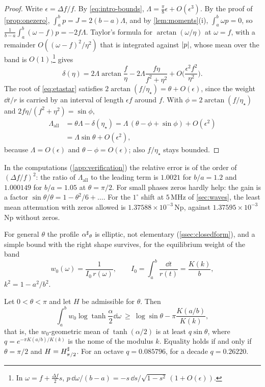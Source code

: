 \begin{proof}
Write $\epsilon=\Delta f/f$. By \eqref{eq:intro-bounds}, $\Lambda=\frac\pi8\epsilon+O(\epsilon^3)$.
By the proof of \cref{prop:onezero}, $\int_a^bp=J=2(b-a)\Lambda$, and by
\cref{lem:moments}(i), $\int_a^b\omega p=0$, so
$\frac1{b-a}\int_a^b(\omega-f)p=-2f\Lambda$. Taylor's formula for
$\arctan(\omega/\eta)$ at $\omega=f$, with a remainder $O((\omega-f)^2/\eta^2)$ that
is integrated against $\left|p\right|$, whose mean over the band is
$O(1)$,\footnote{In $\omega=f+\frac{\Delta f}2s$, $p\,\dd\omega/(b-a)=-s\,\dd s/\sqrt{1-s^2}\,(1+O(\epsilon))$.}
gives
\[
\delta(\eta)=2\Lambda\arctan\frac f\eta-2\Lambda\frac{f\eta}{f^2+\eta^2}
+O\Big(\frac{\epsilon^2f^2}{\eta^2}\Big).
\]
The root of \eqref{eq:etastar} satisfies $2\arctan(f/\eta_\star)=\theta+O(\epsilon)$,
since the weight $\dd t/r$ is carried by an interval of length $\epsilon f$
around $f$. With $\phi=2\arctan(f/\eta_\star)$ and
$2f\eta/(f^2+\eta^2)=\sin\phi$,
\begin{align*}
\Lambda_{\mathrm{all}}&=\theta\Lambda-\delta(\eta_\star)=\Lambda\,(\theta-\phi+\sin\phi)+O(\epsilon^2)\\
&=\Lambda\sin\theta+O(\epsilon^2),
\end{align*}
because $\Lambda=O(\epsilon)$ and $\theta-\phi=O(\epsilon)$; also $f/\eta_\star$ stays
bounded.
\end{proof}

In the computations (\cref{app:verification}) the relative error is of the
order of $(\Delta f/f)^2$: the ratio of $\Lambda_{\mathrm{all}}$ to the leading
term is $1.0021$ for $b/a=1.2$ and $1.000149$ for $b/a=1.05$ at $\theta=\pi/2$.
For small phases zeros hardly help: the gain is a factor
$\sin\theta/\theta=1-\theta^2/6+\dots$. For the $1^\circ$ shift at $5$\,MHz of
\cref{sec:waves}, the least mean attenuation with zeros allowed is
$1.37588\times10^{-3}$\,Np, against $1.37595\times10^{-3}$\,Np without zeros.

For general $\theta$ the profile ${\alpha^{\sharp}}_\theta$ is elliptic, not elementary
(\cref{ssec:closedform}), and a simple bound with the right shape survives, for the equilibrium weight of the band
\[
w_0(\omega)=\frac1{I_0\,r(\omega)},\qquad I_0=\int_a^b\frac{\dd t}{r(t)}=\frac{K(k)}b ,
\]
$k^2=1-a^2/b^2$.

\begin{corollary}\label{cor:nome}
Let $0<\theta<\pi$ and let $H$ be admissible for $\theta$. Then
\begin{equation}\label{eq:nome}
\int_a^bw_0\log\tanh\frac\alpha2\dd\omega\ \ge\ \log\sin\theta-\pi\frac{K(a/b)}{K(k)} ,
\end{equation}
that is, the $w_0$-geometric mean of $\tanh(\alpha/2)$ is at least
$q\sin\theta$, where $q=e^{-\pi K(a/b)/K(k)}$ is the nome of the modulus $k$.
Equality holds if and only if $\theta=\pi/2$ and $H=H^{\sharp}_{\pi/2}$. For an octave
$q=0.085796$, for a decade $q=0.26220$.
\end{corollary}

